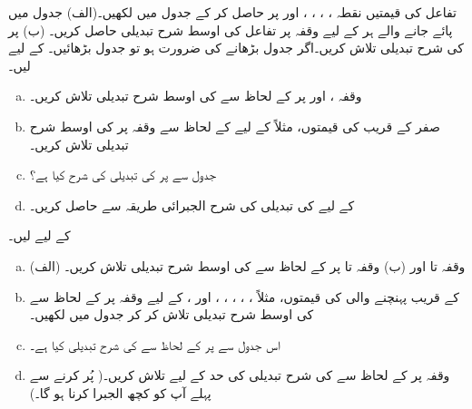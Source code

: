 تفاعل  کی قیمتیں نقطہ ، ، ، ،  اور  پر  حاصل کر کے جدول میں لکھیں۔(الف) جدول میں پائے جانے والے ہر  کے لیے وقفہ  پر تفاعل کی اوسط شرح تبدیلی حاصل کریں۔ (ب)  پر  کی شرح تبدیلی تلاش کریں۔اگر جدول بڑھانے کی ضرورت ہو تو جدول بڑھائیں۔ 
 کے لیے  لیں۔
\begin{enumerate}[a.]
\item
وقفہ ،  اور  پر  کے  لحاظ سے  کی اوسط شرح تبدیلی تلاش کریں۔
\item
صفر کے قریب  کی قیمتوں، مثلاً  کے لیے  کے لحاظ سے وقفہ  پر  کی اوسط شرح تبدیلی تلاش کریں۔
\item
جدول سے  پر  کی تبدیلی کی شرح کیا ہے؟
\item
{} کے لیے  کی تبدیلی کی شرح الجبرائی طریقہ سے حاصل کریں۔
\end{enumerate}
 کے لیے  لیں۔
\begin{enumerate}[a.]
\item
(الف) وقفہ  تا  اور  (ب) وقفہ  تا  پر  کے لحاظ سے  کی اوسط شرح تبدیلی تلاش کریں۔ 
\item
{}  کے قریب  پہنچنے والی  کی قیمتوں، مثلاً ، ، ، ، ، اور ، کے لیے وقفہ  پر  کے لحاظ سے  کی اوسط شرح تبدیلی تلاش کر کر جدول میں لکھیں۔
\item
اس جدول سے  پر  کے لحاظ سے  کی شرح تبدیلی کیا ہے۔
\item
وقفہ  پر  کے لحاظ سے  کی شرح تبدیلی کی حد  کے لیے  تلاش کریں۔( پُر کرنے سے پہلے آپ کو کچھ الجبرا کرنا ہو گا۔)
\end{enumerate}
